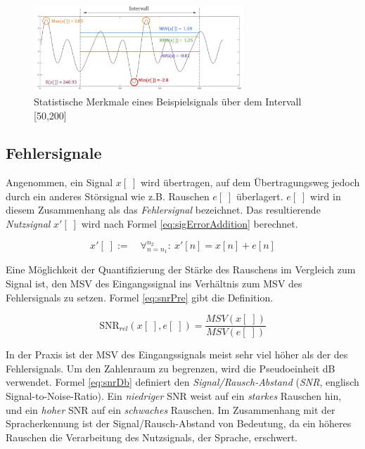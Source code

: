 \begin{figure}[h]
	\centering
	\includegraphics[width=0.7\textwidth]{bilder/sigStats02.png}
	\caption{Statistische Merkmale eines Beispielsignals über dem Intervall [50,200]}
	\label{img:sigStats}
\end{figure}

\subsection{Fehlersignale}

Angenommen, ein Signal $x[\;]$ wird übertragen, auf dem Übertragungsweg jedoch durch ein anderes Störsignal wie z.B. Rauschen $e[\;]$ überlagert. $e[\;]$ wird in diesem Zusammenhang als das \emph{Fehlersignal} bezeichnet. Das resultierende \emph{Nutzsignal} $x'[\;]$ wird nach Formel \ref{eq:sigErrorAddition} berechnet. 

\begin{equation}
x'[\;] := \quad \mathop{\forall}_{n = n_1}^{n_2} :\ x'[n] = x[n] + e[n]
\label{eq:sigErrorAddition}
\end{equation}

Eine Möglichkeit der Quantifizierung der Stärke des Rauschens im Vergleich zum Signal ist, den MSV des Eingangssignal ins Verhältnis zum MSV des Fehlersignals zu setzen. Formel \ref{eq:snrPre} gibt die Definition.


\begin{equation}
\text{SNR}_{rel}(x[\;],e[\;]) = \frac{MSV(x[\;])}{MSV(e[\;])}
\label{eq:snrPre}
\end{equation}

In der Praxis ist der MSV des Eingangssignals meist sehr viel höher als der des Fehlersignals. Um den Zahlenraum zu begrenzen, wird die Pseudoeinheit dB verwendet. Formel \ref{eq:snrDb} definiert den \emph{Signal/Rausch-Abstand} (\emph{SNR}, englisch Signal-to-Noise-Ratio). Ein \emph{niedriger} SNR weist auf ein \emph{starkes} Rauschen hin, und ein \emph{hoher} SNR auf ein \emph{schwaches} Rauschen. Im Zusammenhang mit der Spracherkennung ist der Signal/Rausch-Abstand von Bedeutung, da ein höheres Rauschen die Verarbeitung des Nutzsignals, der Sprache, erschwert.


